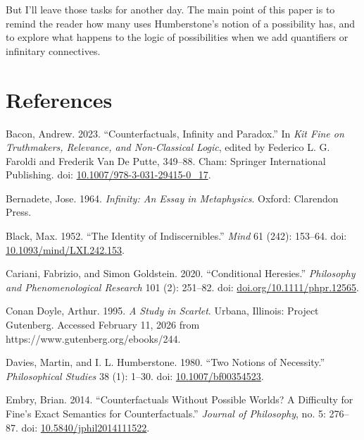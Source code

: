 \documentclass[
  11pt,
  letterpaper,
  DIV=11,
  numbers=noendperiod,
  twoside]{scrartcl}
\newlength{\cslhangindent}
\newenvironment{CSLReferences}[2] %
 {\begin{list}{}{%
  \setlength{\itemindent}{0pt}
  \setlength{\leftmargin}{0pt}
  \setlength{\parsep}{0pt}
  \ifodd #1
   \setlength{\leftmargin}{\cslhangindent}
   \setlength{\itemindent}{-1\cslhangindent}
  \fi
  \setlength{\itemsep}{#2\baselineskip}}}
 {\end{list}}
\begin{document}
But I'll leave those tasks for another day. The main point of this paper
is to remind the reader how many uses Humberstone's notion of a
possibility has, and to explore what happens to the logic of
possibilities when we add quantifiers or infinitary connectives.

\section*{References}\label{references}

\protect{}\label{refs}
\begin{CSLReferences}{1}{0}
Bacon, Andrew. 2023. {``Counterfactuals, Infinity and Paradox.''} In
\emph{Kit Fine on Truthmakers, Relevance, and Non-Classical Logic},
edited by Federico L. G. Faroldi and Frederik Van De Putte, 349--88.
Cham: Springer International Publishing. doi:
\href{https://doi.org/10.1007/978-3-031-29415-0_17}{10.1007/978-3-031-29415-0\_17}.

Bernadete, Jose. 1964. \emph{Infinity: An Essay in Metaphysics}. Oxford:
Clarendon Press.

Black, Max. 1952. {``The Identity of Indiscernibles.''} \emph{Mind} 61
(242): 153--64. doi:
\href{https://doi.org/10.1093/mind/LXI.242.153}{10.1093/mind/LXI.242.153}.

Cariani, Fabrizio, and Simon Goldstein. 2020. {``Conditional
Heresies.''} \emph{Philosophy and Phenomenological Research} 101 (2):
251--82. doi:
\href{https://doi.org/doi.org/10.1111/phpr.12565}{doi.org/10.1111/phpr.12565}.

Conan Doyle, Arthur. 1995. \emph{A Study in Scarlet}. Urbana, Illinois:
Project Gutenberg. Accessed February 11, 2026 from
https://www.gutenberg.org/ebooks/244.

Davies, Martin, and I. L. Humberstone. 1980. {``Two Notions of
Necessity.''} \emph{Philosophical Studies} 38 (1): 1--30. doi:
\href{https://doi.org/10.1007/bf00354523}{10.1007/bf00354523}.

Embry, Brian. 2014. {``Counterfactuals Without Possible Worlds? A
Difficulty for Fine's Exact Semantics for Counterfactuals.''}
\emph{Journal of Philosophy}, no. 5: 276--87. doi:
\href{https://doi.org/10.5840/jphil2014111522}{10.5840/jphil2014111522}.


\end{CSLReferences}
\end{document}
